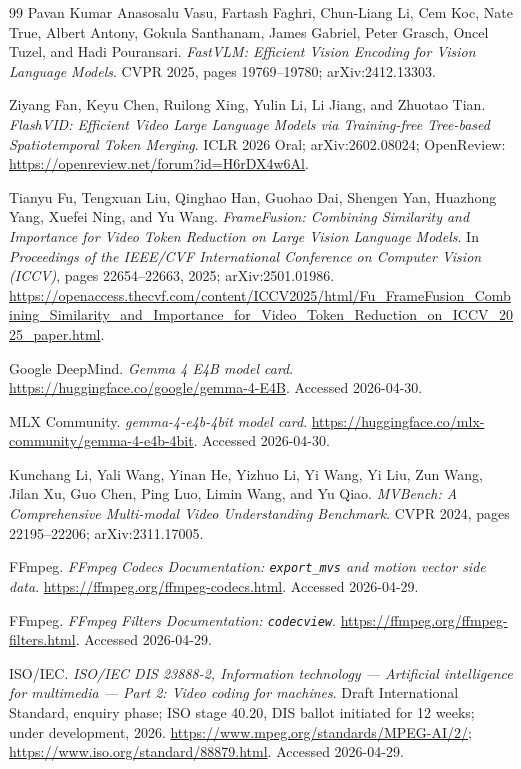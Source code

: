 \begin{thebibliography}{99}
Pavan Kumar Anasosalu Vasu, Fartash Faghri, Chun-Liang Li, Cem Koc, Nate
True, Albert Antony, Gokula Santhanam, James Gabriel, Peter Grasch, Oncel
Tuzel, and Hadi Pouransari.
\emph{FastVLM: Efficient Vision Encoding for Vision Language Models}. CVPR
2025, pages 19769--19780; arXiv:2412.13303.

Ziyang Fan, Keyu Chen, Ruilong Xing, Yulin Li, Li Jiang, and Zhuotao Tian.
\emph{FlashVID: Efficient Video Large Language Models via Training-free
Tree-based Spatiotemporal Token Merging}. ICLR 2026 Oral; arXiv:2602.08024;
OpenReview: \url{https://openreview.net/forum?id=H6rDX4w6Al}.

Tianyu Fu, Tengxuan Liu, Qinghao Han, Guohao Dai, Shengen Yan, Huazhong Yang,
Xuefei Ning, and Yu Wang.
\emph{FrameFusion: Combining Similarity and Importance for Video Token
Reduction on Large Vision Language Models}. In \emph{Proceedings of the
IEEE/CVF International Conference on Computer Vision (ICCV)}, pages
22654--22663, 2025; arXiv:2501.01986.
\url{https://openaccess.thecvf.com/content/ICCV2025/html/Fu_FrameFusion_Combining_Similarity_and_Importance_for_Video_Token_Reduction_on_ICCV_2025_paper.html}.

Google DeepMind. \emph{Gemma 4 E4B model card}.
\url{https://huggingface.co/google/gemma-4-E4B}. Accessed 2026-04-30.

MLX Community. \emph{gemma-4-e4b-4bit model card}.
\url{https://huggingface.co/mlx-community/gemma-4-e4b-4bit}. Accessed
2026-04-30.

Kunchang Li, Yali Wang, Yinan He, Yizhuo Li, Yi Wang, Yi Liu, Zun Wang, Jilan
Xu, Guo Chen, Ping Luo, Limin Wang, and Yu Qiao.
\emph{MVBench: A Comprehensive Multi-modal Video Understanding Benchmark}.
CVPR 2024, pages 22195--22206; arXiv:2311.17005.

FFmpeg. \emph{FFmpeg Codecs Documentation: \texttt{export\_mvs} and motion
vector side data}. \url{https://ffmpeg.org/ffmpeg-codecs.html}. Accessed
2026-04-29.

FFmpeg. \emph{FFmpeg Filters Documentation: \texttt{codecview}}.
\url{https://ffmpeg.org/ffmpeg-filters.html}. Accessed 2026-04-29.

ISO/IEC. \emph{ISO/IEC DIS 23888-2, Information technology --- Artificial
intelligence for multimedia --- Part 2: Video coding for machines}. Draft
International Standard, enquiry phase; ISO stage 40.20, DIS ballot initiated
for 12 weeks; under development, 2026.
\url{https://www.mpeg.org/standards/MPEG-AI/2/};
\url{https://www.iso.org/standard/88879.html}. Accessed 2026-04-29.


\end{thebibliography}
